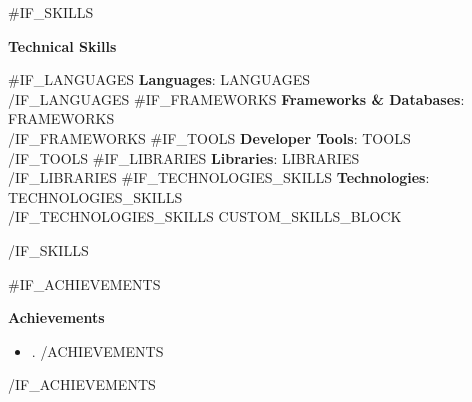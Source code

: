 \documentclass[a4paper,11pt]{article}
\newcommand{\resumeSubHeadingListStart}{\begin{itemize}[leftmargin=*,labelsep=0mm]}
\newcommand{\resumeSubHeadingListEnd}{\end{itemize}\vspace{2mm}}
\newcommand{\cvsection}[1]{%
\vspace{2mm}
\begin{tcolorbox}
    \textbf{\large #1}
\end{tcolorbox}
    \vspace{-4mm}
}
\begin{document}
{{#IF_SKILLS}}
\cvsection{Technical Skills}
\begin{itemize}[leftmargin=0.15in, label={}]
    \small{\item{
     {{#IF_LANGUAGES}} \textbf{Languages}{: {{LANGUAGES}}} \\ {{/IF_LANGUAGES}}
     {{#IF_FRAMEWORKS}} \textbf{Frameworks \& Databases}{: {{FRAMEWORKS}}} \\ {{/IF_FRAMEWORKS}}
     {{#IF_TOOLS}} \textbf{Developer Tools}{: {{TOOLS}}} \\ {{/IF_TOOLS}}
     {{#IF_LIBRARIES}} \textbf{Libraries}{: {{LIBRARIES}}} \\ {{/IF_LIBRARIES}}
     {{#IF_TECHNOLOGIES_SKILLS}} \textbf{Technologies}{: {{TECHNOLOGIES_SKILLS}}} \\ {{/IF_TECHNOLOGIES_SKILLS}}
     {{CUSTOM_SKILLS_BLOCK}}
    }}
\end{itemize}
{{/IF_SKILLS}}

{{#IF_ACHIEVEMENTS}}
\cvsection{Achievements}
\vspace{-0.2mm}
\resumeSubHeadingListStart
  {{#ACHIEVEMENTS}}
    \item\small{{{.}}} \vspace{-2mm}
  {{/ACHIEVEMENTS}}
\resumeSubHeadingListEnd
\vspace{-2mm}
{{/IF_ACHIEVEMENTS}}
\end{document}
